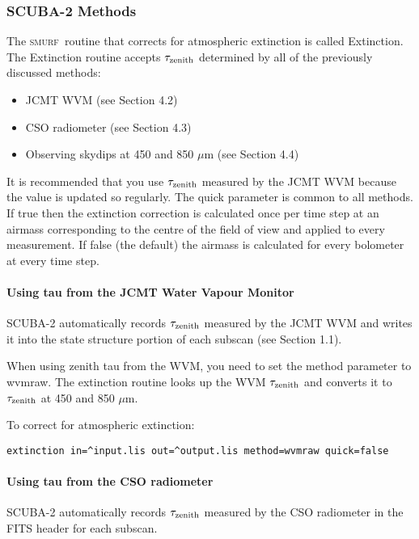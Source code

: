\documentclass[twoside,11pt]{article}
\renewcommand{\_}{\texttt{\symbol{95}}}
\newcommand{\SMURF}{\textsc{smurf}}
\begin{document}
\subsubsection{SCUBA-2 Methods}

The \SMURF\ routine that corrects for atmospheric extinction is called
Extinction.  The Extinction routine accepts $\tau_{\rm zenith}$
determined by all of the previously discussed methods:
\begin{itemize}
\item JCMT WVM (see Section 4.2)
\item CSO radiometer (see Section 4.3)
\item Observing skydips at 450 and 850 $\mu$m (see Section 4.4)
\end{itemize}

It is recommended that you use $\tau_{\rm zenith}$ measured by the
JCMT WVM because the value is updated so regularly. The quick
parameter is common to all methods. If true then the extinction
correction is calculated once per time step at an airmass
corresponding to the centre of the field of view and applied to every
measurement. If false (the default) the airmass is calculated for
every bolometer at every time step. 

\paragraph{Using tau from the JCMT Water Vapour Monitor}

SCUBA-2 automatically records $\tau_{\rm zenith}$ measured by the JCMT
WVM and writes it into the state structure portion of each subscan
(see Section 1.1).

When using zenith tau from the WVM, you need to set the method
parameter to wvmraw. The extinction routine looks up the WVM
$\tau_{\rm zenith}$ and converts it to $\tau_{\rm zenith}$ at 450 and
850 $\mu$m.

To correct for atmospheric extinction:
\begin{verbatim}
extinction in=^input.lis out=^output.lis method=wvmraw quick=false
\end{verbatim}

\paragraph{Using tau from the CSO radiometer}

SCUBA-2 automatically records $\tau_{\rm zenith}$ measured by the CSO
radiometer in the FITS header for each subscan.
\end{document}
